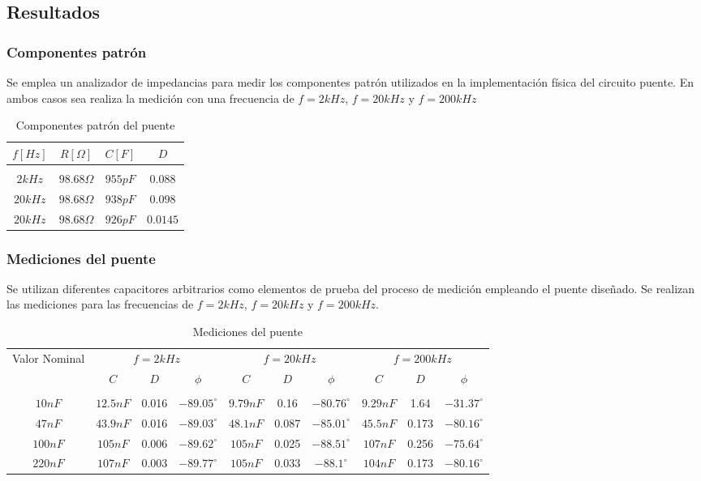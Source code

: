 \subsection{Resultados}

\subsubsection{Componentes patr\'on}
Se emplea un analizador de impedancias para medir los componentes patr\'on utilizados en la implementaci\'on f\'isica del circuito puente. En ambos casos sea realiza la medici\'on con una frecuencia de  $f = 2kHz$, $f = 20kHz$ y $f = 200kHz$

\begin{table}[H]
    \centering
    \begin{tabular}{c c c c}
        $f [Hz]$ & $R [\Omega]$ & $C [F]$ & $D$ \\
        \hline \\
        $2kHz$ & $98.68\Omega$ & $955pF$ & $0.088$ \\
        $20kHz$ & $98.68\Omega$ & $938pF$ & $0.098$ \\
        $20kHz$ & $98.68\Omega$ & $926pF$ & $0.0145$ \\
        \hline
    \end{tabular}
    \caption{Componentes patr\'on del puente}
    \label{tab:mediciones_componentes_patron}
\end{table}

\subsubsection{Mediciones del puente}
Se utilizan diferentes capacitores arbitrarios como elementos de prueba del proceso de medici\'on empleando el puente dise\~nado. Se realizan las mediciones para las frecuencias de $f = 2kHz$, $f = 20kHz$ y $f = 200kHz$.

\begin{table}[H]
    \centering
    \begin{tabular}{c | c c c  c c c  c c c}
         Valor Nominal & \multicolumn{3}{c}{$f = 2kHz$} & \multicolumn{3}{c}{$f = 20kHz$} & \multicolumn{3}{c}{$f = 200kHz$} \\
         & $C$ & $D$ & $\phi$ & $C$ & $D$ & $\phi$ & $C$ & $D$ & $\phi$  \\
         \hline \\
         $10nF$ & $12.5nF$ &0.016 &$-89.05^\circ$& $9.79nF$&0.16&$-80.76^\circ$ &$9.29nF$ &1.64 &$-31.37^\circ$ \\
         $47nF$ & $43.9nF$&0.016 & $-89.03^\circ$& $48.1nF$&0.087 &  $-85.01^\circ$& $45.5nF$& 0.173&$-80.16^\circ$  \\
         $100nF$ & $105nF$& 0.006& $-89.62^\circ$& $105nF$ &0.025 &$-88.51^\circ$ &$107nF$ & 0.256&$-75.64^\circ$  \\
         $220nF$ &$107nF$ &0.003 & $-89.77^\circ$&$105nF$ & 0.033& $-88.1^\circ$&$104nF$ & 0.173& $-80.16^\circ$ \\
         \hline
    \end{tabular}
    \caption{Mediciones del puente}
    \label{tab:mediciones_del_puente}
\end{table}

